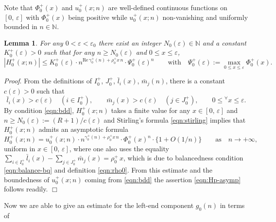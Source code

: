 \documentclass[a4paper,12pt]{article}
\theoremstyle{plain}
\newtheorem{lemma}[theorem]{Lemma}
\def\rRe{\mathrm{Re}}
\def\N{\mathbb{N}}
\def\ve{\varepsilon}
\begin{document}
Note that $\Phi_0^+(x)$ and $u_0^+(x; n)$ are well-defined continuous 
functions on $[0, \, \ve]$ with $\Phi_0^+(x)$ being positive while 
$u_0^+(x; n)$ non-vanishing and uniformly bounded in $n \in \N$.  
\begin{lemma} \label{lem:Hp} 
For any $0 < \ve < \ve_0$ there exist an integer $N_0(\ve) \in \N$ and 
a constant $K_0^+(\ve) > 0$ such that for any 
$n \ge N_0(\ve)$ and $0 \le x \le \ve$,      
\begin{equation} \label{eqn:Hp-asymp} 
|H_0^+(x; n)| \le K_0^+(\ve) \cdot n^{ \rRe \, \gamma_0^+(n) + \rho_0^+ x \, n} 
\cdot \Psi_0^+(\ve)^n \qquad \mbox{with} \quad   
\Psi_0^+(\ve) := \max_{0 \le x \le \ve} \Phi_0^+(x).   
\end{equation} 
\end{lemma}
{\it Proof}. 
From the definitions of $I_0^+$, $J_0^+$, $\bar{l}_i(x)$, $\bar{m}_j(n)$,  
there is a constant $c(\ve) > 0$ such that     
\[
\bar{l}_i(x) > c(\ve) \quad (i \in I_0^+), \qquad  
\bar{m}_j(x) > c(\ve) \quad (j \in J_0^+), \qquad  0 \le {}^{\forall} x \le \ve. 
\]
By condition \eqref{eqn:bdd}, $H_0^+(x; n)$ takes a finite value for any 
$x \in [0, \, \ve]$ and $n \ge N_0(\ve) := (R+1)/c(\ve)$ and Stirling's 
formula \eqref{eqn:stirling} implies that $H_0^+(x; n)$ admits an 
asymptotic formula 
\[ 
H_0^+(x; n) = u_0^+(x; n) \cdot n^{\gamma_0^+(n) + \rho_0^+ x \, n} \cdot 
\Phi_0^+(x)^n \cdot \{ 1+ O(1/n) \} \qquad \mbox{as} \quad n \to + \infty,     
\]
uniform in $x \in [0, \, \ve]$, where one also uses the equality 
$\sum_{i \in I_0^+} \bar{l}_i(x) - 
\sum_{j \in J_0^+} \bar{m}_j(x) = \rho_0^+ \, x$,  
which is due to balancedness condition \eqref{eqn:balance-bq} 
and definition \eqref{eqn:rho0}.  
From this estimate and the boundedness of $u_0^+(x; n)$ coming from 
\eqref{eqn:bdd} the assertion \eqref{eqn:Hp-asymp} follows readily.  
\hfill $\Box$ \par\medskip 
Now we are able to give an estimate for the left-end component $g_0(n)$ in terms of   
\end{document}
